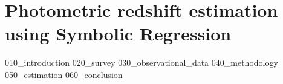 \chapter{Photometric redshift estimation using Symbolic Regression}
{010_introduction}
{020_survey}
{030_observational_data}
{040_methodology}
{050_estimation}
{060_conclusion}

